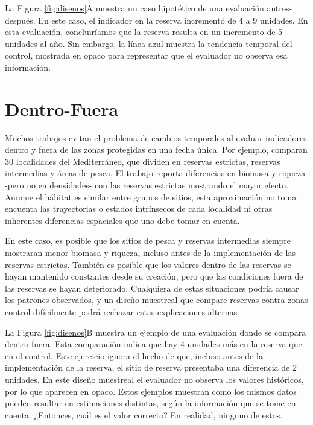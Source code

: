 \documentclass[]{krantz}
\begin{document}
La Figura \ref{fig:disenos}A muestra un caso hipotético de una
evaluación antres-después. En este caso, el indicador en la reserva
incrementó de 4 a 9 unidades. En esta evaluación, concluiríamos que la
reserva resulta en un incremento de 5 unidades al año. Sin embargo, la
línea azul muestra la tendencia temporal del control, mostrada en opaco
para representar que el evaluador no observa esa información.

\hypertarget{dentro-fuera}{%
\section{Dentro-Fuera}\label{dentro-fuera}}

Muchos trabajos evitan el problema de cambios temporales al evaluar
indicadores dentro y fuera de las zonas protegidas en una fecha única.
Por ejemplo, \citet{guidetti_2014} comparan 30 localidades del
Mediterráneo, que dividen en reservas estrictas, reservas intermedias y
áreas de pesca. El trabajo reporta diferencias en biomasa y riqueza
-pero no en densidades- con las reservas estrictas mostrando el mayor
efecto. Aunque el hábitat es similar entre grupos de sitios, esta
aproximación no toma encuenta las trayectorias o estados intrínsecos de
cada localidad ni otras inherentes diferencias espaciales que uno debe
tomar en cuenta.

En este caso, es posible que los sitios de pesca y reservas intermedias
siempre mostraran menor biomasa y riqueza, incluso antes de la
implementación de las reservas estrictas. También es posible que los
valores dentro de las reservas se hayan mantenido constantes desde su
creación, pero que las condiciones fuera de las reservas se hayan
deteriorado. Cualquiera de estas situaciones podría causar los patrones
observados, y un diseño muestreal que compare reservas contra zonas
control difícilmente podrá rechazar estas explicaciones alternas.

La Figura \ref{fig:disenos}B muestra un ejemplo de una evaluación donde
se compara dentro-fuera. Esta comparación indica que hay 4 unidades más
en la reserva que en el control. Este ejercicio ignora el hecho de que,
incluso antes de la implementación de la reserva, el sitio de reserva
presentaba una diferencia de 2 unidades. En este diseño muestreal el
evaluador no observa los valores históricos, por lo que aparecen en
opaco. Estos ejemplos muestran como los mismos datos pueden resultar en
estimaciones distintas, según la información que se tome en cuenta.
¿Entonces, cuál es el valor correcto? En realidad, ninguno de estos.
\end{document}
